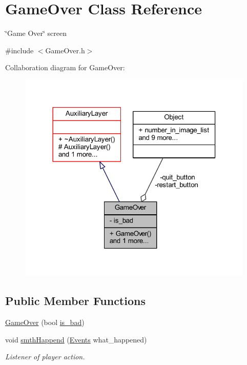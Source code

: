 \hypertarget{class_game_over}{}\section{Game\+Over Class Reference}
\label{class_game_over}


\char`\"{}\+Game Over\char`\"{} screen  




{\ttfamily \#include $<$Game\+Over.\+h$>$}



Collaboration diagram for Game\+Over\+:\nopagebreak
\begin{figure}[H]
\begin{center}
\leavevmode
\includegraphics[width=318pt]{class_game_over__coll__graph}
\end{center}
\end{figure}
\subsection*{Public Member Functions}
\begin{DoxyCompactItemize}
\item 
\hyperlink{class_game_over_a3eb13fd94a63ff6dace1e1265b0c535d}{Game\+Over} (bool \hyperlink{class_game_over_a4a7103cf4db129cad83b0c001c32d116}{is\+\_\+bad})
\item 
void \hyperlink{class_game_over_a919e7ac37c476bf288f732f9a8106016}{smth\+Happend} (\hyperlink{_events_8h_af60e00b78607064c5be6aa9397ea49c1}{Events} what\+\_\+happened)
\begin{DoxyCompactList}\small\item\em Listener of player action. \end{DoxyCompactList}\end{DoxyCompactItemize}
